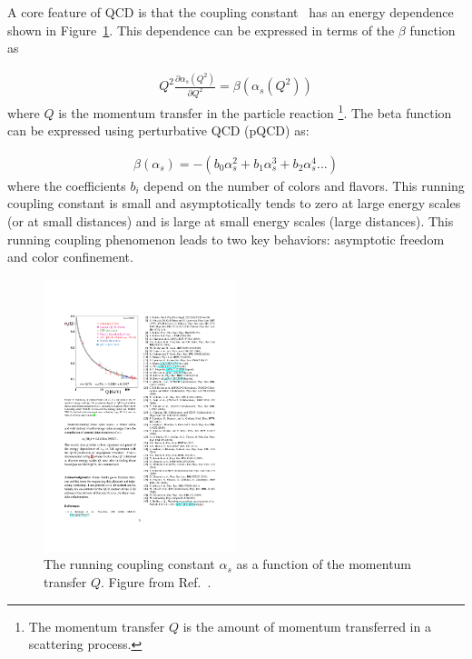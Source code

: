 A core feature of QCD is that the coupling constant \alphas\ has an energy dependence shown in Figure~\ref{fig:running_coupling}.
This dependence can be expressed in terms of the $\beta$ function as

\begin{align}
Q^2 \frac{\partial \alpha_s (Q^2)}{\partial Q^2} = \beta(\alpha_s (Q^2))
\end{align}
where $Q$ is the momentum transfer in the particle reaction
\footnote{The momentum transfer $Q$ is the amount of momentum transferred in a scattering process.}.
The beta function can be expressed using perturbative QCD (pQCD) as:

\begin{align}
\beta( \alpha_s ) = - (b_0 \alpha_s^2 + b_1 \alpha_s^3 + b_2 \alpha_s^4...)
\end{align}
where the coefficients $b_i$ depend on the number of colors and flavors.
This running coupling constant is small and asymptotically tends to zero at large energy scales (or at small distances) and is large at small energy scales (large distances).
This running coupling phenomenon leads to two key behaviors: asymptotic freedom and color confinement.

\begin{figure}[htbp]
\begin{center}
\includegraphics[width=0.5\textwidth]{figures/theory/running_coupling}
\caption{The running coupling constant $\alpha_s$ as a function of the momentum transfer $Q$.
Figure from Ref.~\cite{Beringer:1481544}.}
\label{fig:running_coupling}
\end{center}
\end{figure}



